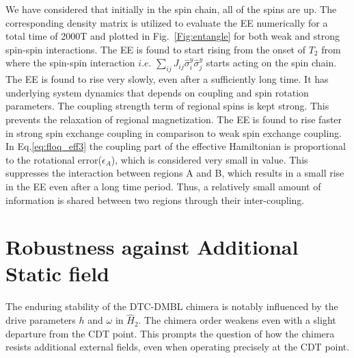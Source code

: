 \documentclass[%
reprint,
superscriptaddress,
amsmath,amssymb,showkeys,
aps,
prb,
]{revtex4-2}
\begin{document}
	We have considered that initially in the spin chain, all of the spins are up. The corresponding density matrix is utilized to evaluate the EE numerically for a total time of 2000T and  plotted in Fig.~\ref{Fig:entangle} for both weak and strong spin-spin interactions. The EE is found to start rising from the onset of $T_2$ from where the spin-spin interaction $\textit{i.e.}$  $\displaystyle \sum_{ij}J_{ij}\hat{\sigma}^y_i\hat{\sigma}^y_j$ starts acting on the spin chain. The EE is found to rise very slowly, even after a sufficiently long time. It has underlying system dynamics that depends on coupling and spin rotation parameters. The coupling strength term of regional spins is kept strong. This prevents the relaxation of regional magnetization. The EE is found to rise faster in strong spin exchange coupling in comparison to weak spin exchange coupling. In Eq.\eqref{eq:floq_eff3} the coupling part of the effective Hamiltonian is proportional to the rotational error($\epsilon_A$), which is considered very small in value. This suppresses the interaction between regions A and B, which results in a small rise in the EE even after a long time period. Thus, a relatively small amount of information is shared between two regions through their inter-coupling.
	
	\section{\label{sec:level6} Robustness against Additional Static field}
	
	
	The enduring stability of the DTC-DMBL chimera is notably influenced by the drive parameters $h$ and $\omega$ in $\hat{H}_2$. The chimera order weakens even with a slight departure from the CDT point. This prompts the question of how the chimera resists additional external fields, even when operating precisely at the CDT point.
	
\end{document}
